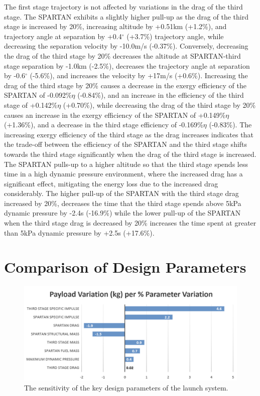 The first stage trajectory is not affected by variations in the drag of the third stage. 
The SPARTAN exhibits a slightly higher pull-up as the drag of the third stage is increased by 20\%, increasing altitude by +0.51km (+1.2\%), and trajectory angle at separation by +0.4$^\circ$ (+3.7\%) trajectory angle, while decreasing the separation velocity by -10.0m/s (-0.37\%). Conversely, decreasing the drag of the third stage by 20\% decreases the altitude at SPARTAN-third stage separation by -1.0km (-2.5\%), decreases the trajectory angle at separation by -0.6$^\circ$ (-5.6\%), and increases the velocity by +17m/s (+0.6\%). 
Increasing the drag of the third stage by 20\% causes a decrease in the exergy efficiency of the SPARTAN of -0.092\%$\eta$ (-0.84\%), and an increase in the efficiency of the third stage of +0.142\%$\eta$ (+0.70\%), while decreasing the drag of the third stage by 20\% causes an increase in the exergy efficiency of the SPARTAN of +0.149\%$\eta$ (+1.36\%), and a decrease in the third stage efficiency of -0.169\%$\eta$ (-0.83\%). The increasing exergy efficiency of the third stage as the drag increases indicates that the trade-off between the efficiency of the SPARTAN and the third stage shifts towards the third stage significantly when the drag of the third stage is increased. The SPARTAN pulls-up to a higher altitude so that the third stage spends less time in a high dynamic pressure environment, where the increased drag has a significant effect, mitigating the energy loss due to the increased drag considerably. The higher pull-up of the SPARTAN with the third stage drag increased by 20\%, decreases the time that the third stage spends above 5kPa dynamic pressure by -2.4s (-16.9\%) while the lower pull-up of the SPARTAN when the third stage drag is decreased by 20\% increases the time spent at greater than 5kPa dynamic pressure by +2.5s (+17.6\%).

\section{Comparison of Design Parameters}\label{sec:comparisonNoReturn}

\begin{figure}[ht!]
	\centering
	\includegraphics[width=0.99\linewidth]{figures/5_Ascent/BarChartRelativePayloadChange}
	\caption{The sensitivity of the key design parameters of the launch system.}
	\label{fig:BarChartRelativePayloadChange}
\end{figure}

